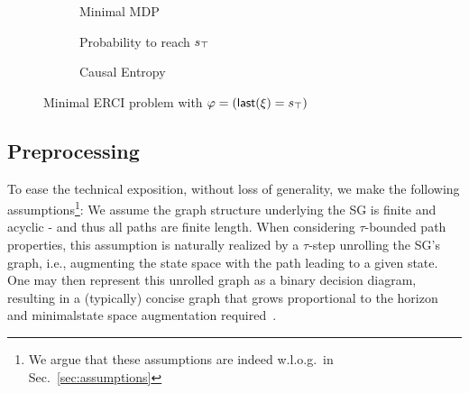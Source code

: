 {{{\begin{figure}
\centering
\begin{subfigure}{0.2\columnwidth}
\centering
{}
\caption{Minimal MDP}
\label{fig:minimal:mdp}
\end{subfigure}
\begin{subfigure}{0.38\columnwidth}
\centering
{}
\caption{Probability to reach $s_{\top}$}
\label{fig:minimal:soft}
\end{subfigure}
\begin{subfigure}{0.38\columnwidth}
\centering
{}
\caption{Causal Entropy}
\label{fig:minimal:entropy}
\end{subfigure}

\caption{Minimal ERCI problem with $\varphi = ( \mathsf{last}({\xi}) = s_{\top} )$}
\end{figure}


\subsection{Preprocessing}
To ease the technical exposition, without loss of generality, we make
the following assumptions\footnote{We argue that these assumptions are
indeed w.l.o.g.\ in Sec.~\ref{sec:assumptions}}: We assume the graph
structure underlying the SG is finite and acyclic - and thus all paths
are finite length. When considering $\tau$-bounded path properties,
this assumption is naturally realized by a $\tau$-step unrolling the
SG's graph, i.e., augmenting the state space with the path leading to
a given state.  One may then represent this unrolled graph as a binary
decision diagram, resulting in a (typically) concise graph that grows
proportional to the horizon and minimal\footnotemark state space augmentation
required~\cite{DBLP:conf/cav/Vazquez-Chanlatte20}.

}}}
